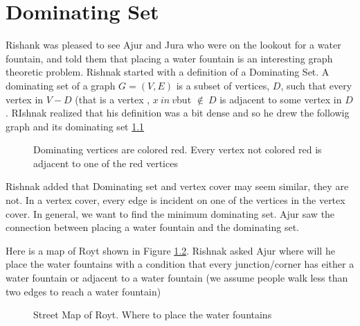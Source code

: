\chapter{Dominating Set}

Rishank was pleased to see Ajur and Jura who were on the lookout for a water fountain, and told them that placing a water fountain is an interesting graph theoretic problem. Rishnak started with a definition of a Dominating Set. A dominating set of a graph $G=(V,E)$ is a subset of vertices, $D$, such that every vertex in $V-D$ (that is a vertex , $x~in ~v $but $\notin~ D$ is adjacent to some vertex in $D$. RIshnak realized that his definition was a bit dense and so he drew the followig graph and its dominating set \ref{18g1}
\begin{figure}
\begin{center}
\caption{ Dominating vertices are colored red. Every vertex not colored red is adjacent to one of the red vertices}\label{18g1}
\end{center}
\end{figure}

Rishnak added that Dominating set and vertex cover may seem similar, they are not. In a vertex cover, every edge is incident on one of the vertices in the vertex cover. In general, we want to find the minimum dominating set. Ajur saw the connection between placing a water fountain and the dominating set.

Here is a map of Royt shown in Figure \ref{18g2}. Rishnak asked Ajur where will he place the water fountains with a condition that every junction/corner has either a water fountain or adjacent to a water fountain (we assume people walk less than two edges to reach a water fountain)
\begin{figure}
\begin{center}

\caption{Street Map of Royt. Where to place the water fountains}\label{18g2}
\end{center}
\end{figure}

